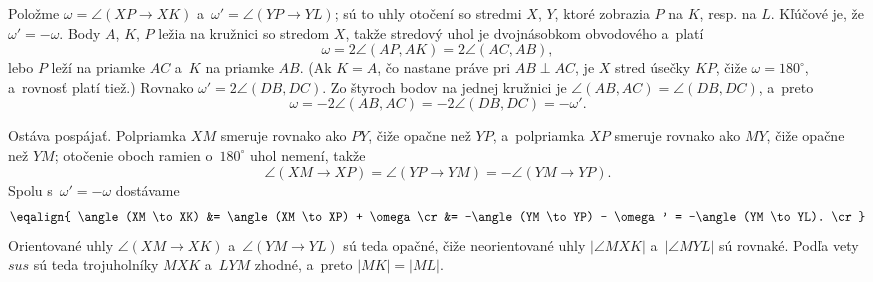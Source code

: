 {    Položme $\omega = \angle(XP \to XK)$ a~$\omega' = \angle(YP \to YL)$; sú to uhly otočení so stredmi $X$, $Y$, ktoré zobrazia $P$ na $K$, resp. na $L$. Kľúčové je, že $\omega' = -\omega$. Body $A$, $K$, $P$ ležia na kružnici so stredom $X$, takže stredový uhol je dvojnásobkom obvodového a~platí
    $$
    \omega = 2\angle(AP,AK) = 2\angle(AC,AB),
    $$
    lebo $P$ leží na priamke $AC$ a~$K$ na priamke $AB$. (Ak $K = A$, čo nastane práve pri $AB \perp AC$, je $X$ stred úsečky $KP$, čiže $\omega = 180^\circ$, a~rovnosť platí tiež.) Rovnako $\omega' = 2\angle(DB,DC)$. Zo štyroch bodov na jednej kružnici je $\angle(AB,AC) = \angle(DB,DC)$, a~preto
    $$
    \omega = -2\angle(AB,AC) = -2\angle(DB,DC) = -\omega'.
    $$

    Ostáva pospájať. Polpriamka $XM$ smeruje rovnako ako $PY$, čiže opačne než $YP$, a~polpriamka $XP$ smeruje rovnako ako $MY$, čiže opačne než $YM$; otočenie oboch ramien o~$180^\circ$ uhol nemení, takže
    $$
    \angle(XM \to XP) = \angle(YP \to YM) = -\angle(YM \to YP).
    $$
    Spolu s~$\omega' = -\omega$ dostávame
    $$
    \eqalign{
        \angle(XM \to XK) &= \angle(XM \to XP) + \omega \cr
        &= -\angle(YM \to YP) - \omega' = -\angle(YM \to YL). \cr
    }
    $$
    Orientované uhly $\angle(XM \to XK)$ a~$\angle(YM \to YL)$ sú teda opačné, čiže neorientované uhly $|\angle MXK|$ a~$|\angle MYL|$ sú rovnaké. Podľa vety $sus$ sú teda trojuholníky $MXK$ a~$LYM$ zhodné, a~preto $|MK| = |ML|$.
}

